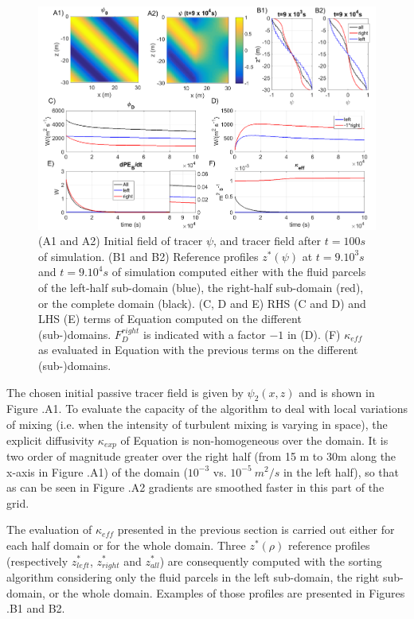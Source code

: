 \begin{figure}[h!]
\centering
\includegraphics[width=1\textwidth]{./CHAP_BPE/AGBPE_numlab2_2.png}
\caption[Initial field and evaluation of $\kappa_{eff}$ for configuration $BPE_{exp}$]{(A1 and A2) Initial field of tracer $\psi$, and tracer field after $t=100s$ of simulation. (B1 and B2) Reference profiles $z^*(\psi)$ at $t=9.10^3s$ and $t=9.10^4s$ of simulation computed either with the fluid parcels of the left-half sub-domain (blue), the right-half sub-domain (red), or the complete domain (black). (C, D and E) RHS (C and D) and LHS (E) terms of Equation  computed on the different (sub-)domains. $F_D^{right}$ is indicated with a factor $-1$ in (D). (F) $\kappa_{eff}$ as evaluated in Equation  with the previous terms on the different (sub-)domains.}
\label{fig2numlab}
\end{figure}

The chosen initial passive tracer field is given by $\psi_2 (x,z)$ and is shown in Figure .A1.
To evaluate the capacity of the algorithm to deal with local variations of mixing (i.e. when the intensity of turbulent mixing is varying in space), the explicit diffusivity $\kappa_{exp}$ of Equation  is non-homogeneous over the domain. It is two order of magnitude greater over the right half (from 15 m to 30m along the x-axis in Figure .A1) of the domain ($10^{-3}$ vs. $10^{-5} \ m^2/s$ in the left half), so that as can be seen in Figure .A2 gradients are smoothed faster in this part of the grid.

The evaluation of $\kappa_{eff}$ presented in the previous section is carried out either for each half domain or for the whole domain. Three $z^*(\rho)$ reference profiles (respectively $z^*_{left}$, $z^*_{right}$ and $z^*_{all}$) are consequently computed with the sorting algorithm considering only the fluid parcels in the left sub-domain, the right sub-domain, or the whole domain. Examples of those profiles are presented in Figures .B1 and B2.

